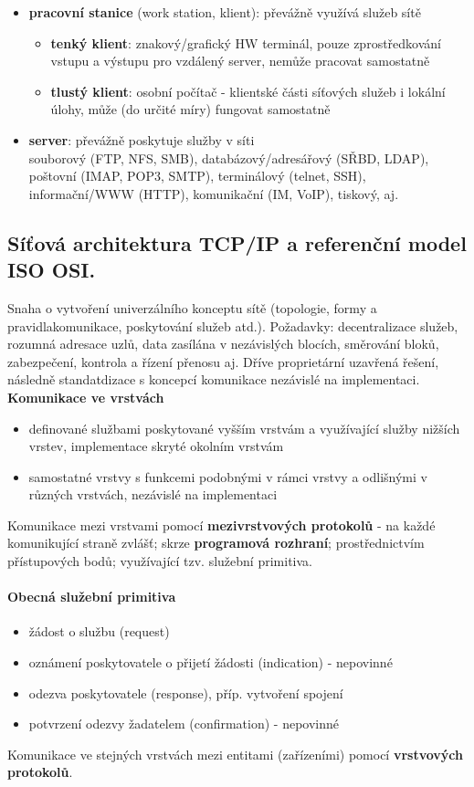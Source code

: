 \documentclass[10pt,a4paper]{article}
\begin{document}
\begin{itemize}
	\item \textbf{pracovní stanice} (work station, klient): převážně využívá služeb sítě
	\begin{itemize}
		\item \textbf{tenký klient}: znakový/grafický HW terminál, pouze zprostředkování vstupu a výstupu pro vzdálený server, nemůže pracovat samostatně
		\item \textbf{tlustý klient}: osobní počítač - klientské části síťových služeb i lokální úlohy, může (do určité míry) fungovat samostatně
	\end{itemize}
	\item \textbf{server}: převážně poskytuje služby v síti \\ souborový (FTP, NFS, SMB), databázový/adresářový (SŘBD, LDAP), poštovní (IMAP, POP3, SMTP), terminálový (telnet, SSH), informační/WWW (HTTP), komunikační (IM, VoIP), tiskový, aj.
\end{itemize}




\subsection{Síťová architektura TCP/IP a referenční model ISO OSI.}
Snaha o vytvoření univerzálního konceptu sítě (topologie, formy a pravidlakomunikace, poskytování služeb atd.). Požadavky: decentralizace služeb, rozumná adresace uzlů, data zasílána v nezávislých blocích, směrování bloků, zabezpečení, kontrola a řízení přenosu aj. Dříve proprietární uzavřená řešení, následně standatdizace s koncepcí komunikace nezávislé na implementaci. \\
\textbf{Komunikace ve vrstvách}
\begin{itemize}
	\item definované službami poskytované vyšším vrstvám a využívající služby nižších vrstev, implementace skryté okolním vrstvám
	\item samostatné vrstvy s funkcemi podobnými v rámci vrstvy a odlišnými v různých vrstvách, nezávislé na implementaci
\end{itemize}
Komunikace mezi vrstvami pomocí \textbf{mezivrstvových protokolů} - na každé komunikující straně zvlášť; skrze \textbf{programová rozhraní}; prostřednictvím přístupových bodů; využívající tzv. služební primitiva.
\paragraph{Obecná služební primitiva}
\begin{itemize}
	\item žádost o službu (request)
	\item oznámení poskytovatele o přijetí žádosti (indication) - nepovinné
	\item odezva poskytovatele (response), příp. vytvoření spojení
	\item potvrzení odezvy žadatelem (confirmation) - nepovinné
\end{itemize}
Komunikace ve stejných vrstvách mezi entitami (zařízeními) pomocí \textbf{vrstvových protokolů}.
\end{document}
